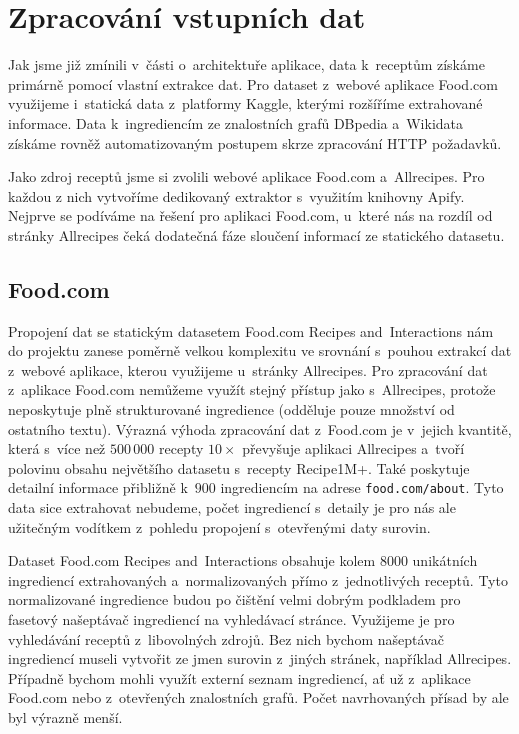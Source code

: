 \section{Zpracování vstupních dat}

Jak jsme již zmínili v~části o~architektuře aplikace, data k~receptům získáme primárně pomocí vlastní extrakce dat. Pro dataset z~webové aplikace Food.com využijeme i~statická data z~platformy Kaggle, kterými rozšíříme extrahované informace. Data k~ingrediencím ze znalostních grafů DBpedia a~Wikidata získáme rovněž automatizovaným postupem skrze zpracování HTTP požadavků.

Jako zdroj receptů jsme si zvolili webové aplikace Food.com a~Allrecipes. Pro každou z nich vytvoříme dedikovaný extraktor s~využitím knihovny Apify. Nejprve se podíváme na řešení pro aplikaci Food.com, u~které nás na rozdíl od stránky Allrecipes čeká dodatečná fáze sloučení informací ze statického datasetu.

\subsection{Food.com}

Propojení dat se statickým datasetem Food.com Recipes and~Interactions nám do projektu zanese poměrně velkou komplexitu ve srovnání s~pouhou extrakcí dat z~webové aplikace, kterou využijeme u~stránky Allrecipes. Pro zpracování dat z~aplikace Food.com nemůžeme využít stejný přístup jako s~Allrecipes, protože neposkytuje plně strukturované ingredience (odděluje pouze množství od ostatního textu). Výrazná výhoda zpracování dat z~Food.com je v~jejich kvantitě, která s~více než $500\,000$ recepty $10\times$ převyšuje aplikaci Allrecipes a~tvoří polovinu obsahu největšího datasetu s~recepty Recipe1M+. Také poskytuje detailní informace přibližně k~$900$ ingrediencím na adrese \texttt{food.com/about}. Tyto data sice extrahovat nebudeme, počet ingrediencí s~detaily je pro nás ale užitečným vodítkem z~pohledu propojení s~otevřenými daty surovin.

Dataset Food.com Recipes and~Interactions obsahuje kolem $8000$ unikátních ingrediencí extrahovaných a~normalizovaných přímo z~jednotlivých receptů. Tyto normalizované ingredience budou po čištění velmi dobrým podkladem pro fasetový našeptávač ingrediencí na vyhledávací stránce. Využijeme je pro vyhledávání receptů z~libovolných zdrojů. Bez nich bychom našeptávač ingrediencí museli vytvořit ze jmen surovin z~jiných stránek, například Allrecipes. Případně bychom mohli využít externí seznam ingrediencí, ať už z~aplikace Food.com nebo z~otevřených znalostních grafů. Počet navrhovaných přísad by ale byl výrazně menší.

